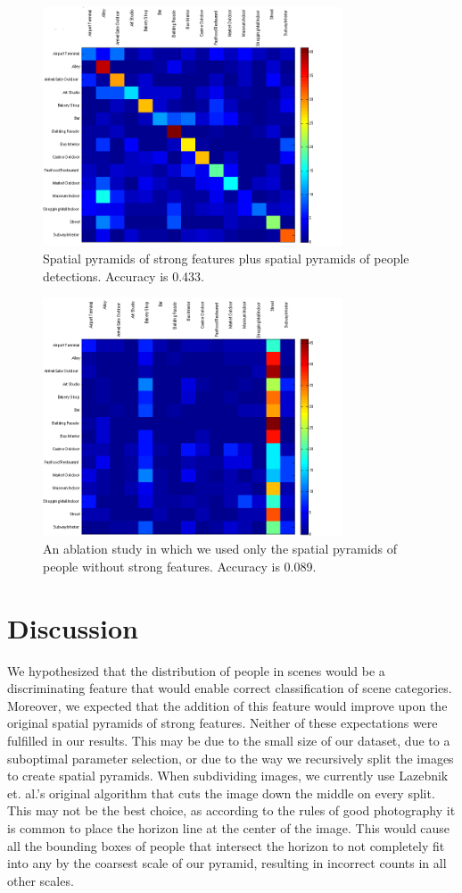 \documentclass[11pt]{article}
\begin{document}
\begin{figure}[p]
 \centering
\includegraphics[width=3.5in]{images/Pyramid_poselets_and_strong_features.png}
 \caption{Spatial pyramids of strong features plus spatial pyramids of people detections. Accuracy is 0.433.}
 \label{fig:pyramid_poselets_strong}
\end{figure}

\begin{figure}[p]
 \centering
\includegraphics[width=3.5in]{images/pyramid_poselets_only.png}
 \caption{An ablation study in which we used only the spatial pyramids of people without strong features. Accuracy is 0.089.}
 \label{fig:pyramid_poselets_only}
\end{figure}

\section{Discussion}

We hypothesized that the distribution of people in scenes would be a discriminating feature that would enable correct classification of scene categories. Moreover, we expected that the addition of this feature would improve upon the original spatial pyramids of strong features. Neither of these expectations were fulfilled in our results. This may be due to the small size of our dataset, due to a suboptimal parameter selection, or due to the way we recursively split the images to create spatial pyramids. When subdividing images, we currently use Lazebnik et. al.'s original algorithm that cuts the image down the middle on every split. This may not be the best choice, as according to the rules of good photography it is common to place the horizon line at the center of the image. This would cause all the bounding boxes of people that intersect the horizon to not completely fit into any by the coarsest scale of our pyramid, resulting in incorrect counts in all other scales.
\end{document}
